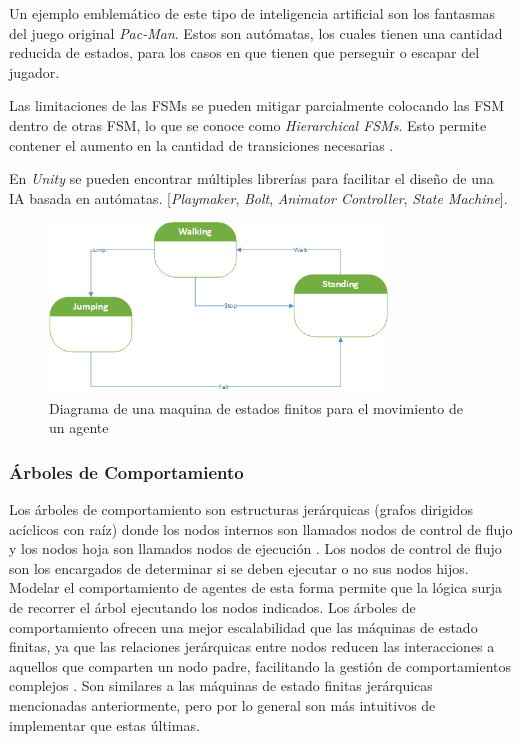 \documentclass[a4paper]{article}
\begin{document}
Un ejemplo emblemático de este tipo de inteligencia artificial son los fantasmas del juego original \textit{Pac-Man}. Estos son autómatas, los cuales tienen una cantidad reducida de estados, para los casos en que tienen que perseguir o escapar del jugador.

Las limitaciones de las FSMs se pueden mitigar parcialmente colocando las FSM dentro de otras FSM, lo que se conoce como \textit{Hierarchical FSMs}. Esto permite contener el aumento en la cantidad de transiciones necesarias \cite{finite_state_machine_in_game_development}.

En \textit{Unity} se pueden encontrar múltiples librerías para facilitar el diseño de una IA basada en autómatas. [\textit{Playmaker}, \textit{Bolt}, \textit{Animator Controller}, \textit{State Machine}].

\begin{figure}[ht]
    \centering
    \includegraphics[width=0.8\textwidth]{./images/finite-state-machine.png}
    \caption{Diagrama de una maquina de estados finitos para el movimiento de un agente}
    \label{fig:fsm}
\end{figure}

\subsubsection{Árboles de Comportamiento}

Los árboles de comportamiento son estructuras jerárquicas (grafos dirigidos acíclicos con raíz) donde los nodos internos son llamados nodos de control de flujo y los nodos hoja son llamados nodos de ejecución \cite{behavior_tress_in_robotics_and_ai}. Los nodos de control de flujo son los encargados de determinar si se deben ejecutar o no sus nodos hijos. Modelar el comportamiento de agentes de esta forma permite que la lógica surja de recorrer el árbol ejecutando los nodos indicados. Los árboles de comportamiento ofrecen una mejor escalabilidad que las máquinas de estado finitas, ya que las relaciones jerárquicas entre nodos reducen las interacciones a aquellos que comparten un nodo padre, facilitando la gestión de comportamientos complejos \cite{behavior_tress_in_robotics_and_ai}. Son similares a las máquinas de estado finitas jerárquicas mencionadas anteriormente, pero por lo general son más intuitivos de implementar que estas últimas.
\end{document}
